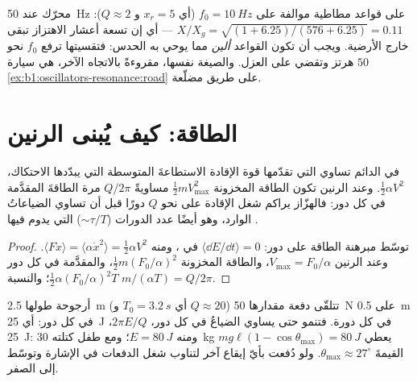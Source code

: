 \begin{example}\label{ex:b1:oscillators-resonance:mounts}
محرّك عند \qty{50}{Hz} على قواعد مطاطية موالفة على $f_0 = \qty{10}{Hz}$
(أي $x_r = 5$ و $Q \approx 2$): $X/X_g = \sqrt{(1 + 6.25)/(576 + 6.25)} = 0.11$
--- أي إن تسعة أعشار الاهتزاز تبقى خارج الأرضية. ويجب أن تكون القواعد
\emph{ألين} مما يوحي به الحدس: فتقسيتها ترفع $f_0$
نحو $50$ هرتز وتقضي على العزل. والصيغة نفسها، مقروءةً
بالاتجاه الآخر، هي سيارة \cref{ex:b1:oscillators-resonance:road} على
طريق مضلّعة.
\end{example}

\section{الطاقة: كيف يُبنى الرنين}

\begin{proposition}\label{prop:b1:oscillators-resonance:energy}
في  الدائم تساوي  التي تقدّمها قوة
الإقادة الاستطاعةَ المتوسطة التي يبدّدها الاحتكاك، $\tfrac12\alpha V^2$.
وعند الرنين تكون الطاقة المخزونة $\tfrac12 mV_{\max}^2$ مساويةً $Q/2\pi$ مرة
الطاقةَ المقدَّمة في كل دور: فالهزّاز يراكم شغل الإقادة
على نحو $Q$ دورًا قبل أن تساوي الضياعاتُ الوارد، وهو أيضًا
عدد الدورات ($\sim\tau/T$) التي يدوم فيها .
\end{proposition}

\begin{proof}
توسّط مبرهنة الطاقة على دور: $\langle\dd E/\dd t\rangle = 0$
في ، ومنه $\langle F\dot x\rangle = \langle\alpha\dot x^2\rangle =
\tfrac12\alpha V^2$. وعند الرنين $V_{\max} = F_0/\alpha$، والطاقة المخزونة
$\tfrac12 m(F_0/\alpha)^2$، والمقدَّمة في كل دور $\tfrac12\alpha(F_0/\alpha)^2T$؛
والنسبة $m/(\alpha T) = Q/2\pi$.
\end{proof}

\begin{example}[الأرجوحة]\label{ex:b1:oscillators-resonance:swing}
أرجوحة طولها \qty{2.5}{m} (أي $T_0 = \qty{3.2}{s}$ و $Q \approx 20$) تتلقّى
دفعة مقدارها \qty{50}{N} على \qty{0.5}{m} في كل دور: أي \qty{25}{J} في
كل دورة. فتنمو حتى يساوي الضياعُ في كل دور، $2\pi E/Q$،
\qty{25}{J}: ومنه $E = \qty{80}{J}$؛ ومع طفل كتلته \qty{30}{kg} يعطي $mg\ell(1 -
\cos\theta_{\max}) = \qty{80}{J}$ القيمةَ $\theta_{\max} \approx 27^\circ$.
ولو دُفعت بأيّ إيقاع آخر لتناوب شغل الدفعات في
الإشارة وتوسّط إلى الصفر.
\end{example}

